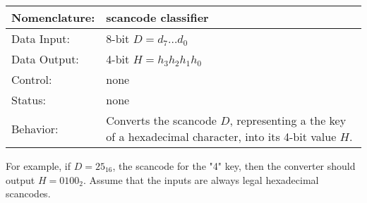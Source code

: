 \begin{enumerate}
                \label{page:scanconv}
                \begin{tabular}{|l|p{3.5in}|} \hline
                    Nomenclature:  & scancode classifier                   \\ \hline
                    Data Input:    & 8-bit $D=d_7 \ldots d_0$          \\ \hline
                    Data Output:   & 4-bit $H=h_3h_2h_1h_0$ \\ \hline
                    Control:       & none             \\ \hline
                    Status:        & none                                   \\ \hline
                    Behavior:      & Converts the scancode $D$, representing a the
                    key of a hexadecimal character, into its 4-bit
                    value $H$.
                    \\ \hline
                \end{tabular}

                For example, if $D=25_{16}$, the scancode for the "4" key, then the converter
                should output $H=0100_2$.  Assume that the inputs are always
                legal hexadecimal scancodes.

        \end{enumerate}
